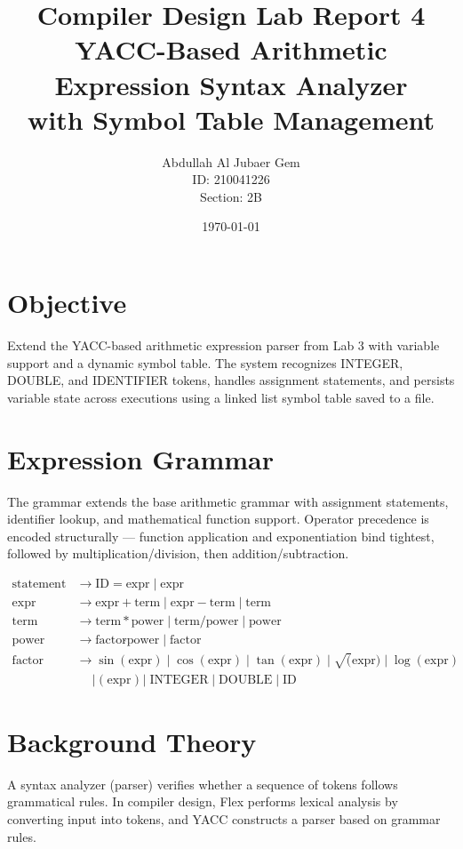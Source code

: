 \documentclass{article}
\title{Compiler Design Lab Report 4\\YACC-Based Arithmetic Expression Syntax Analyzer\\with Symbol Table Management}
\author{Abdullah Al Jubaer Gem\\ID: 210041226\\Section: 2B}
\date{\today}
\begin{document}
\maketitle

\section{Objective}
Extend the YACC-based arithmetic expression parser from Lab 3 with variable support and a dynamic symbol table. The system recognizes INTEGER, DOUBLE, and IDENTIFIER tokens, handles assignment statements, and persists variable state across executions using a linked list symbol table saved to a file.

\section{Expression Grammar}
The grammar extends the base arithmetic grammar with assignment statements, identifier lookup, and mathematical function support. Operator precedence is encoded structurally — function application and exponentiation bind tightest, followed by multiplication/division, then addition/subtraction.

\begin{align*}
\text{statement} &\rightarrow \text{ID} = \text{expr} \mid \text{expr} \\
\text{expr}    &\rightarrow \text{expr} + \text{term} \mid \text{expr} - \text{term} \mid \text{term} \\
\text{term}    &\rightarrow \text{term} * \text{power} \mid \text{term} / \text{power} \mid \text{power} \\
\text{power}   &\rightarrow \text{factor} \mathbin{\hat{}} \text{power} \mid \text{factor} \\
\text{factor}  &\rightarrow \sin(\text{expr}) \mid \cos(\text{expr}) \mid \tan(\text{expr}) \mid \sqrt(\text{expr}) \mid \log(\text{expr}) \\
               &\quad\mid \texttt{(}\;\text{expr}\;\texttt{)} \mid \text{INTEGER} \mid \text{DOUBLE} \mid \text{ID}
\end{align*}

\section{Background Theory}
A syntax analyzer (parser) verifies whether a sequence of tokens follows grammatical rules. In compiler design, Flex performs lexical analysis by converting input into tokens, and YACC constructs a parser based on grammar rules.
\end{document}
